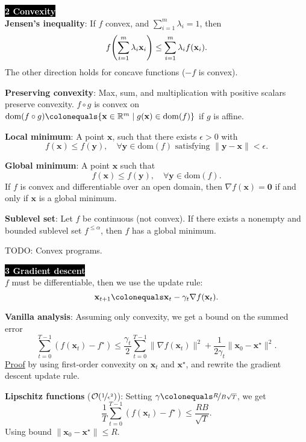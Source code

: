 \documentclass{article}
\newcommand{\lft}{\mathopen{}\mathclose\bgroup\left}
\newcommand{\rgt}{\aftergroup\egroup\right}
\newcommand{\R}{\mathbb{R}}
\renewcommand{\vec}[1]{\mathbf{#1}}
\newcommand{\dom}[1]{\mathrm{dom}(#1)}
\newenvironment{topic}[1]
{\textbf{\sffamily \colorbox{black}{\textcolor{white}{#1}}} \\ \vspace{0.2cm}}
{}
\begin{document}
\begin{multicols*}{3}
\begin{topic}{2 Convexity}
        \textbf{Jensen's inequality}: If $f$ convex, and $\sum_{i=1}^m \lambda_i = 1$, then \[
            f \lft( \sum_{i=1}^{m} \lambda_i \vec{x}_i \rgt) \leq \sum_{i=1}^{m} \lambda_i f(\vec{x}_i).
        \]
        The other direction holds for concave functions ($-f$ is convex).

        \textbf{Preserving convexity}: Max, sum, and multiplication with positive scalars preserve
        convexity. $f \circ g$ is convex on $\dom{f \circ g} \colonequals \{ \vec{x} \in \R^m \mid
            g(\vec{x}) \in \dom{f} \}$ if $g$ is affine.

        \textbf{Local minimum}: A point $\vec{x}$, such that there exists $\epsilon > 0$ with \[
            f(\vec{x}) \leq f(\vec{y}), \quad \forall \vec{y} \in \dom{f} \text{ satisfying } \| \vec{y} - \vec{x} \| < \epsilon.
        \]

        \textbf{Global minimum}: A point $\vec{x}$ such that \[
            f(\vec{x}) \leq f(\vec{y}), \quad \forall \vec{y} \in \dom{f}.
        \]
        If $f$ is convex and differentiable over an open domain, then $\nabla f(\vec{x}) = \vec{0}$ if and
        only if $\vec{x}$ is a global minimum.

        \textbf{Sublevel set}: Let $f$ be continuous (not convex). If there exists a nonempty and
        bounded sublevel set $f^{\leq \alpha}$, then $f$ has a global minimum.

        TODO: Convex programs.
    \end{topic}

    \begin{topic}{3 Gradient descent}
        $f$ must be differentiable, then we use the update rule: \[
            \vec{x}_{t+1} \colonequals \vec{x}_t - \gamma_t \nabla f(\vec{x}_t).
        \]

        \textbf{Vanilla analysis}: Assuming only convexity, we get a bound on the summed error \[
            \sum_{t=0}^{T-1} (f(\vec{x}_t) - f^\star) \leq \frac{\gamma_t}{2} \sum_{t=0}^{T-1} \| \nabla f(\vec{x}_t) \|^2 + \frac{1}{2 \gamma_t} \| \vec{x}_0 - \vec{x}^\star \|^2.
        \]
        \underline{Proof} by using first-order convexity on $\vec{x}_t$ and $\vec{x}^\star$, and rewrite the gradient
        descent update rule.

        \textbf{Lipschitz functions} ($\mathcal{O}(\nicefrac{1}{\epsilon^2})$): Setting
        $\gamma \colonequals \nicefrac{R}{B \sqrt{T}}$, we get \[
            \frac{1}{T} \sum_{t=0}^{T-1} (f(\vec{x}_t) - f^\star) \leq \frac{RB}{\sqrt{T}}.
        \]
        Using bound $\| \vec{x}_0 - \vec{x}^\star \| \leq R$.
    \end{topic}


\end{multicols*}
\end{document}
